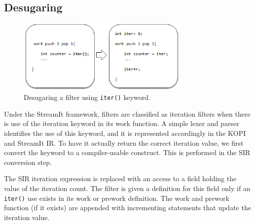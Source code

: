 \subsection{Desugaring}

%
%
%
%
%
%
%
%
%
%


\begin{figure}[t!]
\centering
\includegraphics[width=3.3in]{figures/desugaring.png}
\caption{Desugaring a filter using \texttt{iter()} keyword.\protect\label{fig:desugar}}
\end{figure}


Under the StreamIt framework, filters are classified as iteration filters when there is use of the iteration keyword in its work function.  A simple lexer and parser identifies the use of this keyword, and it is represented accordingly in the KOPI and StreamIt IR.  To have it actually return the correct iteration value, we first convert the keyword to a compiler-usable construct.  This is performed in the SIR conversion step.

The SIR iteration expression is replaced with an access to a field holding the value of the iteration count.  The filter is given a definition for this field only if an {\tt iter()} use exists in its work or prework definition.  The work and prework function (if it exists) are appended with incrementing statements that update the iteration value.

